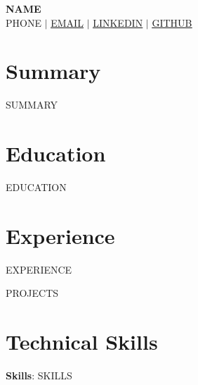 \documentclass[letterpaper,11pt]{article}
\newcommand{\resumeSubHeadingListStart}{\begin{itemize}[leftmargin=0.15in, label={}]}
\newcommand{\resumeSubHeadingListEnd}{\end{itemize}}
\begin{document}
\begin{center}
    \textbf{\Huge \scshape {{NAME}}} \\ \vspace{1pt}
    \small {{PHONE}} $|$ \href{mailto:{{EMAIL}}}{\underline{{{EMAIL}}}} $|$
    \href{https://{{LINKEDIN}}}{\underline{{{LINKEDIN}}}} $|$
    \href{https://{{GITHUB}}}{\underline{{{GITHUB}}}}
\end{center}

\section{Summary}
  \small{{{SUMMARY}}}

\section{Education}
  \resumeSubHeadingListStart
{{EDUCATION}}
  \resumeSubHeadingListEnd

\section{Experience}
  \resumeSubHeadingListStart
{{EXPERIENCE}}
  \resumeSubHeadingListEnd

{{PROJECTS}}

\section{Technical Skills}
 \begin{itemize}[leftmargin=0.15in, label={}]
    \small{\item{
     \textbf{Skills}{: {{SKILLS}}}
    }}
 \end{itemize}

\end{document}
